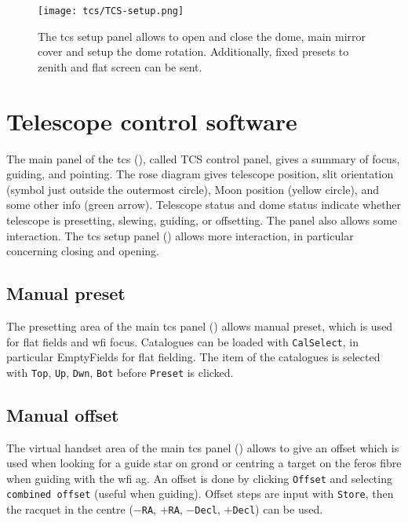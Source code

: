 \documentclass[11pt,fleqn,a4paper]{book}
\begin{document}
\begin{figure}[!ht]
\centering
\texttt{[image: tcs/TCS-setup.png]}
\caption[Setup panel of the telescope control software]{The \gls{tcs} setup panel allows to open and close the \gls{dome}, main
mirror cover and setup the \gls{dome} rotation.  Additionally, fixed presets
to zenith and flat screen can be sent.}
\label{fig:tcssetup}
\end{figure}

\section{Telescope control software}

The main panel of the \gls{tcs} (), called \gls{TCS control panel}, gives a summary of \gls{focus},
guiding, and \gls{pointing}. The \gls{rose diagram} gives telescope position, \gls{slit}
orientation (symbol just outside the outermost circle), Moon position (yellow
circle), and some other info (green arrow). Telescope status and \gls{dome} status
indicate whether telescope is \gls{preset}ting, slewing, guiding, or offsetting.  The
panel also allows some interaction.  The \gls{tcs} setup panel
() allows more interaction, in particular concerning
closing and opening.

\subsection{Manual preset}  
\label{manualpreset}


The \gls{preset}ting area  of the main \gls{tcs} panel () allows manual
preset, which is used for flat fields and \gls{wfi} \gls{focus}.  Catalogues can be loaded
with \texttt{CalSelect}, in particular EmptyFields for flat fielding. The item
of the catalogues is selected with \texttt{Top}, \texttt{Up}, \texttt{Dwn},
\texttt{Bot} before \texttt{Preset} is clicked.

\subsection{Manual offset}
\label{manualoffset}

The virtual handset area of the main \gls{tcs} panel ()
allows to give an offset which is used when looking for a guide star on
\gls{grond} or centring a target on the \gls{feros} fibre when guiding with the
\gls{wfi} \gls{ag}.  An offset is done by clicking \texttt{Offset} and
selecting \texttt{combined offset} (useful when guiding).  Offset steps are
input with \texttt{Store}, then the racquet in the centre (\texttt{$-$RA},
\texttt{$+$RA}, \texttt{$-$Decl}, \texttt{$+$Decl}) can be used.
\end{document}
